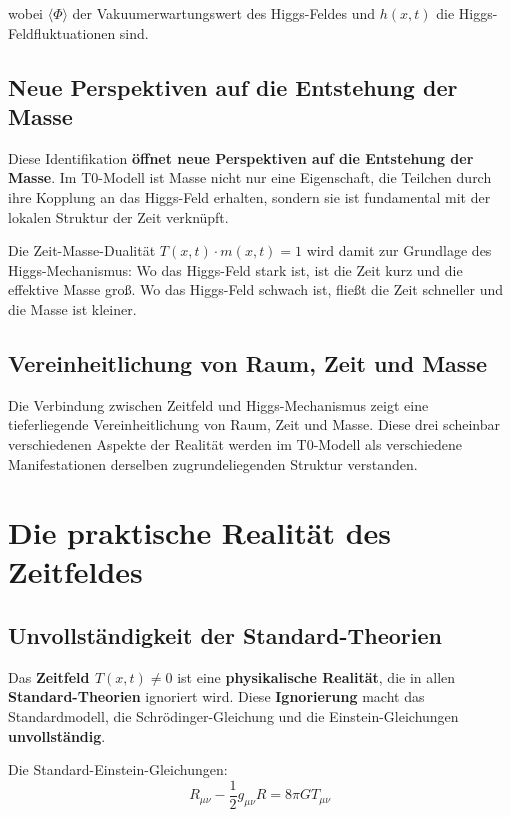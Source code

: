 \documentclass[12pt,a4paper]{report}
\begin{document}
wobei $\langle\Phi\rangle$ der Vakuumerwartungswert des Higgs-Feldes und $h(x,t)$ die Higgs-Feldfluktuationen sind.

\subsection{Neue Perspektiven auf die Entstehung der Masse}

Diese Identifikation \textbf{öffnet neue Perspektiven auf die Entstehung der Masse}. Im T0-Modell ist Masse nicht nur eine Eigenschaft, die Teilchen durch ihre Kopplung an das Higgs-Feld erhalten, sondern sie ist fundamental mit der lokalen Struktur der Zeit verknüpft.

Die Zeit-Masse-Dualität $T(x,t) \cdot m(x,t) = 1$ wird damit zur Grundlage des Higgs-Mechanismus: Wo das Higgs-Feld stark ist, ist die Zeit kurz und die effektive Masse groß. Wo das Higgs-Feld schwach ist, fließt die Zeit schneller und die Masse ist kleiner.

\subsection{Vereinheitlichung von Raum, Zeit und Masse}

Die Verbindung zwischen Zeitfeld und Higgs-Mechanismus zeigt eine tieferliegende Vereinheitlichung von Raum, Zeit und Masse. Diese drei scheinbar verschiedenen Aspekte der Realität werden im T0-Modell als verschiedene Manifestationen derselben zugrundeliegenden Struktur verstanden.


\section{Die praktische Realität des Zeitfeldes}

\subsection{Unvollständigkeit der Standard-Theorien}

Das \textbf{Zeitfeld $T(x,t) \neq 0$} ist eine \textbf{physikalische Realität}, die in allen \textbf{Standard-Theorien} ignoriert wird. Diese \textbf{Ignorierung} macht das Standardmodell, die Schrödinger-Gleichung und die Einstein-Gleichungen \textbf{unvollständig}.

Die Standard-Einstein-Gleichungen:
\begin{equation}
	R_{\mu\nu} - \frac{1}{2}g_{\mu\nu}R = 8\pi G T_{\mu\nu}
\end{equation}
\end{document}
